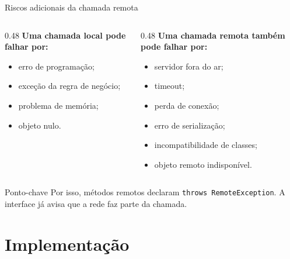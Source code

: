 \documentclass[aspectratio=169]{beamer}
\newcommand{\code}[1]{\texttt{#1}}
\begin{document}
\begin{frame}{Riscos adicionais da chamada remota}
    \begin{columns}[T]
        \begin{column}{0.48\textwidth}
            \textbf{Uma chamada local pode falhar por:}
            \begin{itemize}
                \item erro de programação;
                \item exceção da regra de negócio;
                \item problema de memória;
                \item objeto nulo.
            \end{itemize}
        \end{column}

        \begin{column}{0.48\textwidth}
            \textbf{Uma chamada remota também pode falhar por:}
            \begin{itemize}
                \item servidor fora do ar;
                \item timeout;
                \item perda de conexão;
                \item erro de serialização;
                \item incompatibilidade de classes;
                \item objeto remoto indisponível.
            \end{itemize}
        \end{column}
    \end{columns}

    \vspace{0.35cm}
    \begin{alertblock}{Ponto-chave}
        Por isso, métodos remotos declaram \code{throws RemoteException}. A interface já avisa que a rede faz parte da chamada.
    \end{alertblock}
\end{frame}

\section{Implementação}
\end{document}
